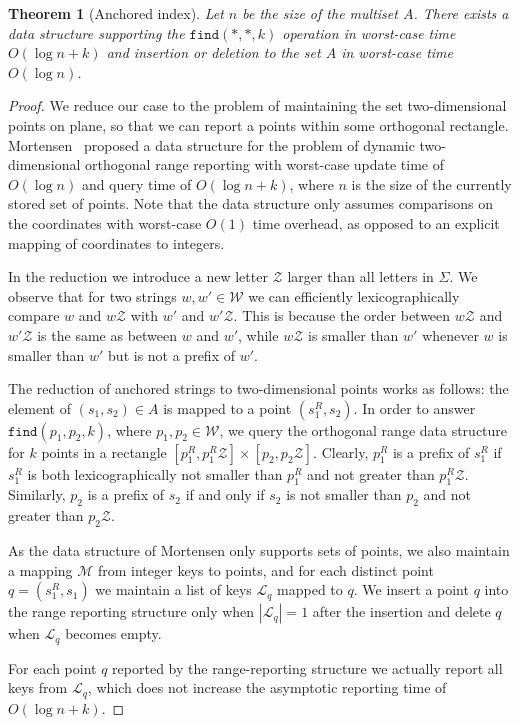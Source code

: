 \documentclass[a4paper]{article}
\newtheorem{theorem}{Theorem}[section]
\theoremstyle{remark}
\newcommand{\anchfind}{\mathtt{find}}
\newcommand{\lastsymb}{\mathcal{Z}}
\newcommand{\coll}{\mathcal{W}}
\begin{document}
\begin{theorem}[Anchored index]\label{thm:ai}
  Let $n$ be the size of the multiset $A$.
  There exists a data structure supporting the $\anchfind(*,*,k)$ operation
in worst-case time $O(\log{n}+k)$ and insertion or deletion
to the set $A$ in worst-case time $O(\log{n})$.
\end{theorem}
\begin{proof}
We reduce our case to the problem of maintaining the set
two-dimensional points on plane, so that
we can report a points within some
orthogonal rectangle.
Mortensen~\cite{Mortensen:2003} proposed a data structure
for the problem of dynamic two-dimensional orthogonal
range reporting with worst-case update time of $O(\log{n})$
and query time of $O(\log{n}+k)$, where
$n$ is the size of the currently stored set of points.
Note that the data structure only assumes comparisons on the coordinates
with worst-case $O(1)$ time overhead, as opposed to an explicit
mapping of coordinates to integers.

In the reduction we introduce a new letter $\lastsymb$ larger than all letters in $\Sigma$.
We observe that for two strings $w,w'\in \coll$ we can efficiently lexicographically compare $w$ and $w\lastsymb$ with $w'$ and $w'\lastsymb$.
This is because the order between $w\lastsymb$ and $w'\lastsymb$ is the same as between $w$ and $w'$,
while $w\lastsymb$ is smaller than $w'$ whenever $w$ is smaller than $w'$ but is not a prefix of $w'$.

The reduction of anchored strings to two-dimensional
points works as follows: the element of $(s_1,s_2)\in A$
is mapped to a point $(s_1^R,s_2)$.
In order to answer $\anchfind(p_1,p_2,k)$, where $p_1,p_2\in \coll$, we
query the orthogonal range data structure for
$k$ points in a rectangle
$[p_1^R,p_1^R\lastsymb]\times [p_2,p_2\lastsymb]$.
Clearly, $p_1^R$ is a prefix of $s_1^R$ if $s_1^R$ is both
lexicographically not smaller than $p_1^R$ and not greater than $p_1^R\lastsymb$.
Similarly, $p_2$ is a prefix of $s_2$ if and only if
$s_2$ is not smaller than $p_2$ and not greater than $p_2\lastsymb$.

As the data structure of Mortensen only supports sets of points,
we also maintain a mapping $\mathcal{M}$ from integer keys to
points, and for each distinct point $q=(s_1^R,s_1)$ we maintain
a list of keys $\mathcal{L}_q$ mapped to $q$.
We insert a point $q$ into the range reporting structure only
when $|\mathcal{L}_q|=1$ after the insertion
and delete $q$ when $\mathcal{L}_q$
becomes empty.

For each point $q$ reported by the range-reporting structure
we actually report all keys from $\mathcal{L}_q$, which does
not increase the asymptotic reporting time of $O(\log{n}+k)$.
\end{proof}
\end{document}
